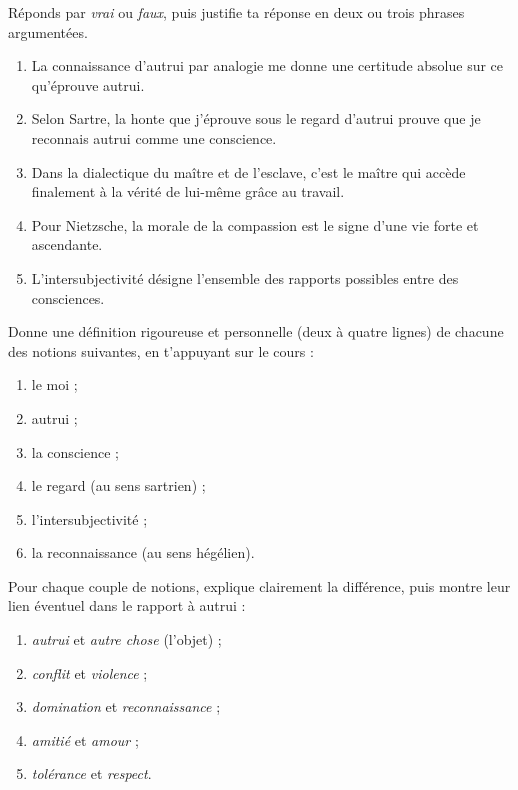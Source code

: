 \documentclass[11pt]{article}
\newcommand{\cle}[1]{{\popxbold\color{popdark}#1}}
\begin{document}
\begin{exercice}
Réponds par \emph{vrai} ou \emph{faux}, puis justifie ta réponse en deux ou trois phrases argumentées.

\begin{enumerate}
\item La connaissance d'autrui par analogie me donne une certitude absolue sur ce qu'éprouve autrui.
\item Selon Sartre, la honte que j'éprouve sous le regard d'autrui prouve que je reconnais autrui comme une conscience.
\item Dans la dialectique du maître et de l'esclave, c'est le maître qui accède finalement à la vérité de lui-même grâce au travail.
\item Pour Nietzsche, la morale de la compassion est le signe d'une vie forte et ascendante.
\item L'intersubjectivité désigne l'ensemble des rapports possibles entre des consciences.
\end{enumerate}
\end{exercice}

\begin{exercice}
Donne une définition rigoureuse et personnelle (deux à quatre lignes) de chacune des notions suivantes, en t'appuyant sur le cours :
\begin{enumerate}
\item le \cle{moi} ;
\item \cle{autrui} ;
\item la \cle{conscience} ;
\item le \cle{regard} (au sens sartrien) ;
\item l'\cle{intersubjectivité} ;
\item la \cle{reconnaissance} (au sens hégélien).
\end{enumerate}
\end{exercice}

\begin{exercice}
Pour chaque couple de notions, explique clairement la différence, puis montre leur lien éventuel dans le rapport à autrui :
\begin{enumerate}
\item \emph{autrui} et \emph{autre chose} (l'objet) ;
\item \emph{conflit} et \emph{violence} ;
\item \emph{domination} et \emph{reconnaissance} ;
\item \emph{amitié} et \emph{amour} ;
\item \emph{tolérance} et \emph{respect}.
\end{enumerate}
\end{exercice}
\end{document}
